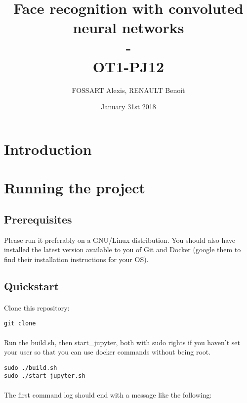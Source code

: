 \documentclass[french]{article}
\title{Face recognition with convoluted neural networks
\\-
\\OT1-PJ12}
\author{FOSSART Alexis, RENAULT Benoit}
\date{January 31st 2018}
\begin{document}
\maketitle

\medskip

\tableofcontents

\newpage

\section{Introduction}



\section{Running the project}

\subsection{Prerequisites}

Please run it preferably on a GNU/Linux distribution. You should also have installed the latest version available to you of Git and Docker (google them to find their installation instructions for your OS).

\subsection{Quickstart}

\paragraph{} Clone this repository:

\begin{verbatim}
git clone
\end{verbatim}

\paragraph{} Run the build.sh, then start\_jupyter, both with sudo rights if you haven't set your user so that you can use docker commands without being root.

\begin{verbatim}
sudo ./build.sh
sudo ./start_jupyter.sh
\end{verbatim}

\paragraph{} The first command log should end with a message like the following:
\end{document}
